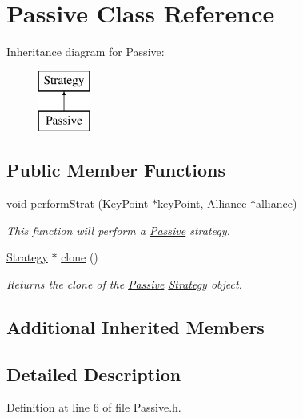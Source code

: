 \hypertarget{classPassive}{}\section{Passive Class Reference}
\label{classPassive}
Inheritance diagram for Passive\+:\begin{figure}[H]
\begin{center}
\leavevmode
\includegraphics[height=2.000000cm]{classPassive}
\end{center}
\end{figure}
\subsection*{Public Member Functions}
\begin{DoxyCompactItemize}
\item 
void \hyperlink{classPassive_ab296d4f8ba8ad68dacef1f80e3041aa7}{perform\+Strat} (Key\+Point $\ast$key\+Point, Alliance $\ast$alliance)
\begin{DoxyCompactList}\small\item\em This function will perform a \hyperlink{classPassive}{Passive} strategy. \end{DoxyCompactList}\item 
\hyperlink{classStrategy}{Strategy} $\ast$ \hyperlink{classPassive_a576243ca77e794959cfcb33e772856a4}{clone} ()
\begin{DoxyCompactList}\small\item\em Returns the clone of the \hyperlink{classPassive}{Passive} \hyperlink{classStrategy}{Strategy} object. \end{DoxyCompactList}\end{DoxyCompactItemize}
\subsection*{Additional Inherited Members}


\subsection{Detailed Description}


Definition at line 6 of file Passive.\+h.



